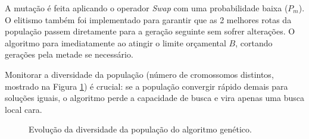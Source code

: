 A mutação é feita aplicando o operador \textit{Swap} com uma probabilidade baixa ($P_m$). O elitismo também foi implementado para garantir que as 2 melhores rotas da população passem diretamente para a geração seguinte sem sofrer alterações. O algoritmo para imediatamente ao atingir o limite orçamental $B$, cortando gerações pela metade se necessário.

Monitorar a diversidade da população (número de cromossomos distintos, mostrado na Figura \ref{fig:ag-diversidade}) é crucial: se a população convergir rápido demais para soluções iguais, o algoritmo perde a capacidade de busca e vira apenas uma busca local cara.

\begin{figure}[H]
\centering
{}
\caption{Evolução da diversidade da população do algoritmo genético.}
\label{fig:ag-diversidade}
\end{figure}